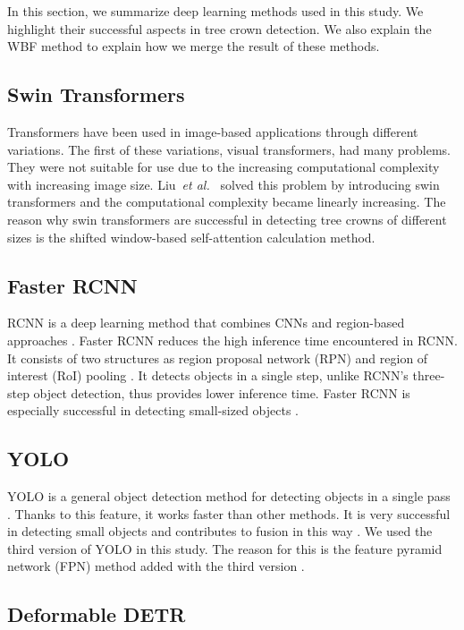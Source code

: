 \documentclass{article}
\begin{document}
In this section, we summarize deep learning methods used in this study. We highlight their successful aspects in tree crown detection. We also explain the WBF method to explain how we merge the result of these methods.

\subsection{Swin Transformers}

Transformers have been used in image-based applications through different variations. The first of these variations, visual transformers, had many problems. They were not suitable for use due to the increasing computational complexity with increasing image size. Liu~\emph{et al.}~\cite{liu2021swin} solved this problem by introducing swin transformers and the computational complexity became linearly increasing. The reason why swin transformers are successful in detecting tree crowns of different sizes is the shifted window-based self-attention calculation method.

\subsection{Faster RCNN}

RCNN is a deep learning method that combines CNNs and region-based approaches \cite{girshick2014rich}. Faster RCNN reduces the high inference time encountered in RCNN. It consists of two structures as region proposal network (RPN) and region of interest (RoI) pooling \cite{ren2015faster}. It detects objects in a single step, unlike RCNN's three-step object detection, thus provides lower inference time. Faster RCNN is especially successful in detecting small-sized objects \cite{nguyen2020evaluation,liu2021survey}. 

\subsection{YOLO}

YOLO is a general object detection method for detecting objects in a single pass \cite{redmon2016you}. Thanks to this feature, it works faster than other methods. It is very successful in detecting small objects and contributes to fusion in this way \cite{wang2022remote}. We used the third version of YOLO in this study. The reason for this is the feature pyramid network (FPN) method added with the third version \cite{redmon2018yolov3}. 

\subsection{Deformable DETR}
\end{document}
